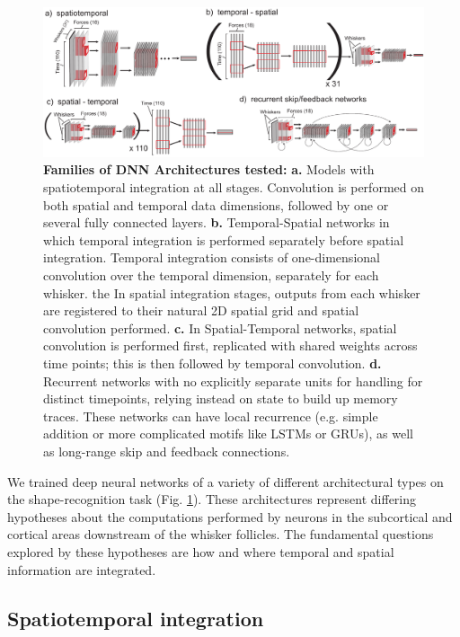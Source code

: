 \begin{figure}
\centering
\includegraphics [width=1\linewidth]{figures/architectures.pdf}
\vspace{-2mm}
\caption{\textbf{Families of DNN Architectures tested:} \textbf{a.} Models with spatiotemporal integration at all stages. Convolution is performed on both spatial and temporal data dimensions, followed by one or several fully connected layers. \textbf{b.} Temporal-Spatial networks in which temporal integration is performed separately before spatial integration.  Temporal integration consists of one-dimensional convolution over the temporal dimension, separately for each whisker. the In spatial integration stages, outputs from each whisker are registered to their natural 2D spatial grid and spatial convolution performed.  \textbf{c.} In Spatial-Temporal networks, spatial convolution is performed first, replicated with shared weights across time points; this is then followed by temporal convolution. \textbf{d.} Recurrent networks with no explicitly separate units for handling for distinct timepoints, relying instead on state to build up memory traces.  These networks can have local recurrence (e.g. simple addition or more complicated motifs like LSTMs or GRUs), as well as long-range skip and feedback connections.~\label{fig_archi}}
\end{figure}

We trained deep neural networks of a variety of different architectural types on the shape-recognition task (Fig. \ref{fig_archi}).  
These architectures represent differing hypotheses about the computations performed by neurons in 
the subcortical and cortical areas downstream of the whisker follicles. 
The fundamental questions explored by these hypotheses are how and where temporal and spatial information are integrated.   


\subsection{Spatiotemporal integration}

